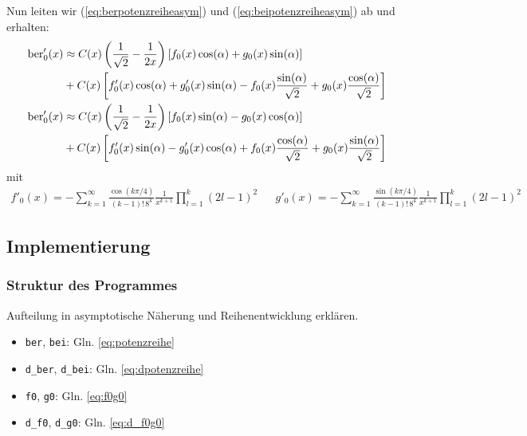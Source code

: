 \documentclass[10pt,a4paper]{article}
\begin{document}
Nun leiten wir (\ref{eq:berpotenzreiheasym}) und (\ref{eq:beipotenzreiheasym}) ab und erhalten:
\begin{align}
	\mathrm{ber}'_0(x) &\approx C(x) \left( \frac{1}{\sqrt{2}} - \frac{1}{2x} \right) \left[f_0(x) \cos(\alpha) + g_0(x) \sin(\alpha) \right] \notag\\ & + C(x) \left[ f'_0(x) \cos(\alpha) + g'_0(x) \sin(\alpha) - f_0(x) \frac{\sin(\alpha)}{\sqrt{2}} + g_0(x) \frac{\cos(\alpha)}{\sqrt{2}} \right]\label{eq:dberpotenzreiheasym}\\
	\mathrm{ber}'_0(x) &\approx C(x) \left( \frac{1}{\sqrt{2}} - \frac{1}{2x} \right) \left[f_0(x) \sin(\alpha) - g_0(x) \cos(\alpha) \right] \notag\\ & + C(x) \left[ f'_0(x) \sin(\alpha) - g'_0(x) \cos(\alpha) + f_0(x) \frac{\cos(\alpha)}{\sqrt{2}} + g_0(x) \frac{\sin(\alpha)}{\sqrt{2}} \right] \label{eq:dbeipotenzreiheasym}
\end{align}
mit
\begin{align}
	f'_0(x) = - \sum^{\infty}_{k=1} \frac{\cos(k \pi / 4)}{(k-1)! \, 8^k} \frac{1}{x^{k+1}} \prod^{k}_{l=1}(2l - 1)^2&&
	g'_0(x) = -\sum^{\infty}_{k=1} \frac{\sin(k \pi / 4)}{(k-1)! \, 8^k} \frac{1}{x^{k+1}} \prod^{k}_{l=1}(2l - 1)^2\label{eq:d_f0g0}
\end{align}

\subsection{Implementierung}

\subsubsection{Struktur des Programmes}
Aufteilung in asymptotische Näherung und Reihenentwicklung erklären.
\begin{itemize}
\item \texttt{ber}, \texttt{bei}: Gln. \ref{eq:potenzreihe}
\item \texttt{d\_ber}, \texttt{d\_bei}: Gln. \ref{eq:dpotenzreihe}
\item \texttt{f0}, \texttt{g0}: Gln. \ref{eq:f0g0}
\item \texttt{d\_f0}, \texttt{d\_g0}: Gln. \ref{eq:d_f0g0}
\end{itemize}
\end{document}
